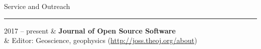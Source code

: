 \documentclass[oneside]{cv}
\newcommand{\heading}[1]{
    \vspace{0.7cm}
    {\HelveticaNeueUltraLight\fontsize{18pt}{0}\selectfont #1}\\
    \vspace{-0.2cm}
    \hrule
    \vspace{0.4cm}
}
\begin{document}
\heading{Service and Outreach}

\begin{entryright}
2017 -- present & \textbf{Journal of Open Source Software} \\
& Editor: Geoscience, geophysics (\href{http://joss.theoj.org/about}{http://joss.theoj.org/about})
\end{entryright}



\end{document}
